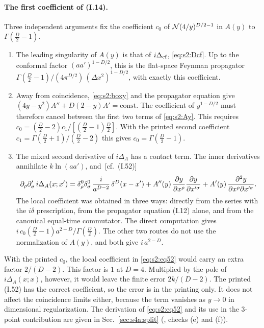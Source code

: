 \documentclass[aps,prd,onecolumn,10pt,nofootinbib,floatfix]{revtex4-2}
\newcommand{\eqI}[1]{(I.#1)}
\begin{document}
\paragraph*{The first coefficient of (I.14).}
Three independent arguments fix the coefficient $c_0$ of
$\mathcal N(4/y)^{D/2-1}$ in $A(y)$ to $\Gamma(\tfrac D2-1)$.
\begin{enumerate}
\item The leading singularity of $A(y)$ is that of $i\Delta_{\rm cf}$,
\eqref{eq:s2:Dcf}. Up to the conformal factor $(aa')^{1-D/2}$, this is the
flat-space Feynman propagator
$\Gamma(\tfrac D2-1)/(4\pi^{D/2})\,(\Delta x^2)^{1-D/2}$, with exactly this
coefficient.
\item Away from coincidence, \eqref{eq:s2:boxy} and the propagator equation
give $(4y-y^2)A''+D(2-y)A'=\text{const}$. The coefficient of $y^{1-D/2}$ must
therefore cancel between the first two terms of \eqref{eq:s2:Ay}. This
requires $c_0=(\tfrac D2-2)c_1/[(\tfrac D2-1)\tfrac D2]$. With the printed
second coefficient $c_1=\Gamma(\tfrac D2+1)/(\tfrac D2-2)$ this gives
$c_0=\Gamma(\tfrac D2-1)$.
\item The mixed second derivative of $i\Delta_A$ has a contact term. The
inner derivatives annihilate $k\ln(aa')$, and~[cf.\ \eqI{52}]
\begin{equation}
\partial_\rho\partial'_\sigma\,i\Delta_A(x;x')=\delta^0_\rho\delta^0_\sigma\,\frac{i}{a^{D-2}}\,\delta^D(x-x')
+A''(y)\,\frac{\partial y}{\partial x^\rho}\frac{\partial y}{\partial x'^\sigma}
+A'(y)\,\frac{\partial^2y}{\partial x^\rho\partial x'^\sigma}.
\label{eq:s2:eq52}
\end{equation}
The local coefficient was obtained in three ways: directly from the series
with the $i\delta$ prescription, from the propagator equation \eqI{12}
alone, and from the canonical equal-time commutator. The direct computation
gives $i\,c_0(\tfrac D2-1)a^{2-D}/\Gamma(\tfrac D2)$. The other two routes
do not use the normalization of $A(y)$, and both give $i\,a^{2-D}$.
\end{enumerate}
With the printed $c_0$, the local coefficient in \eqref{eq:s2:eq52} would
carry an extra factor $2/(D-2)$. This factor is $1$ at $D=4$. Multiplied by
the pole of $i\Delta_A(x;x)$, however, it would leave the finite error
$2k/(D-2)$. The printed \eqI{52} has the correct coefficient, so the error
is in the printing only. It does not affect the coincidence limits either,
because the term vanishes as $y\to0$ in dimensional regularization. The
derivation of \eqref{eq:s2:eq52} and its use in the 3-point contribution
are given in Sec.~\ref{sec:s4a:split}
(, checks (e) and (f)).
\end{document}
